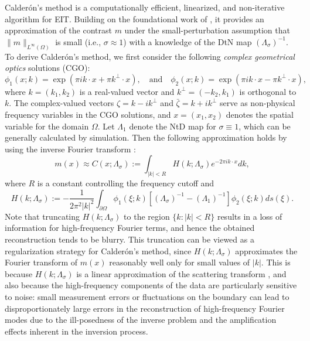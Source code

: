 \documentclass[11pt]{article}
\newcommand{\pa}{\partial}
\newcommand{\Calderon}{Calder\'{o}n}
\begin{document}
\Calderon's method is a computationally efficient, linearized, and non-iterative algorithm for EIT.
Building on the foundational work of \cite{CAP80}, it provides an approximation of the contrast $ m $ under the small-perturbation assumption that $ \|m\|_{L^\infty(\Omega)} $ is small (i.e., $\sigma\approx 1 $) with a knowledge of the DtN map $ (\Lambda_\sigma)^{-1} $.
To derive \Calderon's method, we first consider the following \textit{complex geometrical optics} solutions (CGO):
\begin{equation}\label{41}
\phi_1(x;k) = \exp(\pi ik\cdot x + \pi k^\perp\cdot x),\quad \text{and}\quad\phi_2(x;k) = \exp(\pi ik\cdot x - \pi k^\perp\cdot x),
\end{equation}
where $ k = (k_1, k_2) $ is a real-valued vector and $ k^\perp = (-k_2, k_1) $ is orthogonal to $k$. The complex-valued vectors $\zeta = k - i k^\perp$ and $\bar{\zeta} = k + i k^\perp$ serve as non-physical frequency variables in the CGO solutions, and $ x = (x_1, x_2) $ denotes the spatial variable for the domain $ \Omega $.
Let $\Lambda_1$ denote the NtD map for $ \sigma\equiv 1 $, which can be generally calculated by simulation.
Then the following approximation holds by using the inverse Fourier transform \cite{CAP80, CSJ23}:
\begin{equation}\label{42}
m(x)\approx C(x;\Lambda_\sigma) := \int_{|k|<R}H(k;\Lambda_\sigma)e^{-2\pi ik\cdot x}dk,
\end{equation}
where $ R $ is a constant controlling the frequency cutoff and
\begin{equation}\label{43}
H(k;\Lambda_\sigma) := -\dfrac{1}{2\pi^2|k|^2}\int_{\pa \Omega}\phi_1(\xi;k)\left[(\Lambda_\sigma)^{-1} - (\Lambda_1)^{-1}\right]\phi_2(\xi;k) ds(\xi).
\end{equation}
Note that truncating \( H(k;\Lambda_\sigma) \) to the region \( \{k : |k| < R\} \) results in a loss of information for high-frequency Fourier terms, and hence the obtained reconstruction tends to be blurry. This truncation can be viewed as a regularization strategy for \Calderon's method, since \( H(k; \Lambda_{\sigma}) \) approximates the Fourier transform of \( m(x) \) reasonably well only for small values of \( |k| \). This is because \( H(k; \Lambda_{\sigma}) \) is a linear approximation of the scattering transform \cite{SKM20}, and also because the high-frequency components of the data are particularly sensitive to noise: small measurement errors or fluctuations on the boundary can lead to disproportionately large errors in the reconstruction of high-frequency Fourier modes due to the ill-posedness of the inverse problem and the amplification effects inherent in the inversion process.
\end{document}
